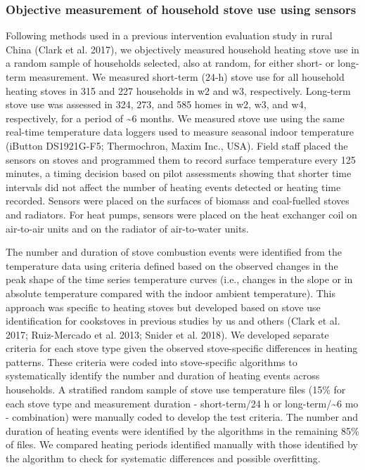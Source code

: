 \documentclass[
  letterpaper,
  DIV=11,
  numbers=noendperiod]{scrartcl}
\begin{document}
\subsubsection{Objective measurement of household stove use using
sensors}\label{objective-measurement-of-household-stove-use-using-sensors}

Following methods used in a previous intervention evaluation study in
rural China (Clark et al. 2017), we objectively measured household
heating stove use in a random sample of households selected, also at
random, for either short- or long-term measurement. We measured
short-term (24-h) stove use for all household heating stoves in 315 and
227 households in w2 and w3, respectively. Long-term stove use was
assessed in 324, 273, and 585 homes in w2, w3, and w4, respectively, for
a period of \textasciitilde6 months. We measured stove use using the
same real-time temperature data loggers used to measure seasonal indoor
temperature (iButton DS1921G-F5; Thermochron, Maxim Inc., USA). Field
staff placed the sensors on stoves and programmed them to record surface
temperature every 125 minutes, a timing decision based on pilot
assessments showing that shorter time intervals did not affect the
number of heating events detected or heating time recorded. Sensors were
placed on the surfaces of biomass and coal-fuelled stoves and radiators.
For heat pumps, sensors were placed on the heat exchanger coil on
air-to-air units and on the radiator of air-to-water units.

The number and duration of stove combustion events were identified from
the temperature data using criteria defined based on the observed
changes in the peak shape of the time series temperature curves (i.e.,
changes in the slope or in absolute temperature compared with the indoor
ambient temperature). This approach was specific to heating stoves but
developed based on stove use identification for cookstoves in previous
studies by us and others (Clark et al. 2017; Ruiz-Mercado et al. 2013;
Snider et al. 2018). We developed separate criteria for each stove type
given the observed stove-specific differences in heating patterns. These
criteria were coded into stove-specific algorithms to systematically
identify the number and duration of heating events across households. A
stratified random sample of stove use temperature files (15\% for each
stove type and measurement duration - short-term/24 h or
long-term/\textasciitilde6 mo - combination) were manually coded to
develop the test criteria. The number and duration of heating events
were identified by the algorithms in the remaining 85\% of files. We
compared heating periods identified manually with those identified by
the algorithm to check for systematic differences and possible
overfitting.
\end{document}
